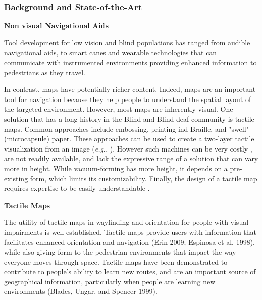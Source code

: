 
\subsubsection{Background and State-of-the-Art}

\textbf{Non visual Navigational Aids}

Tool development for low vision and blind populations has ranged from audible navigational aids, to smart canes and wearable technologies that can communicate with instrumented environments providing enhanced information to pedestrians as they travel. 

In contrast, maps have potentially richer content. Indeed, maps are an important tool for  navigation because they help people to understand the spatial layout of the targeted environment. However, most maps are inherently visual. One solution that has a long history in the Blind and Blind-deaf community is tactile maps. Common approaches include embossing, printing ind Braille, and "swell" (microcapsule) paper. These approaches can be used to create a two-layer tactile visualization from an image (\textit{e.g.}, \cite{miele2006talking}). However such machines can be very costly \cite{rice2005design}, are not readily available, and lack the expressive range of a solution that can vary more in height. While vacuum-forming has more height, it depends on a pre-existing form, which limits its customizability. Finally, the design of a tactile map requires expertise to be easily understandable \cite{tatham1991design}.


\textbf{Tactile Maps}

The utility of tactile maps in wayfinding and orientation for people with visual impairments is well established. Tactile maps provide users with information that facilitates enhanced orientation and navigation (Erin 2009; Espinosa et al. 1998), while also giving form to the pedestrian environments that impact the way everyone moves through space. 
Tactile maps have been demonstrated to contribute to people’s ability to learn new routes, and are an important source of geographical information, particularly when people are learning new environments (Blades, Ungar, and Spencer 1999). 

